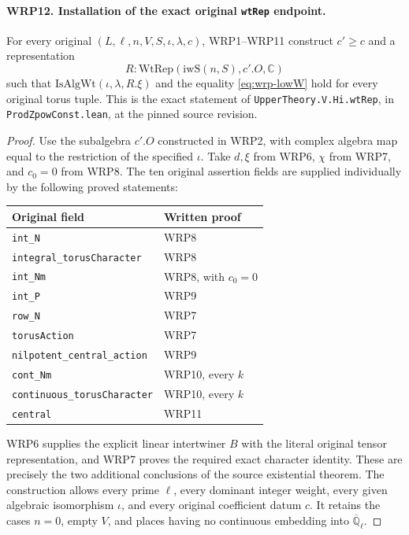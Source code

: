 \paragraph{WRP12. Installation of the exact original \texttt{wtRep} endpoint.}
\label{claim:WRP12}
For every original $(L,\ell,n,V,S,\iota,\lambda,c)$,
WRP1--WRP11 construct $c'\geq c$ and a representation
\[
                  R:\mathrm{WtRep}(\mathrm{iwS}(n,S),c'.O,\mathbb C)
\]
such that $\mathrm{IsAlgWt}(\iota,\lambda,R.\xi)$ and
the equality \eqref{eq:wrp-lowW} hold for every original
torus tuple.  This is the exact statement of
\texttt{UpperTheory.V.Hi.wtRep}, in
\texttt{ProdZpowConst.lean}, at the pinned source revision.
\begin{proof}
Use the subalgebra $c'.O$ constructed in WRP2, with
complex algebra map equal to the restriction of the
specified $\iota$.  Take $d,\xi$ from WRP6,
$\chi$ from WRP7, and $c_0=0$ from WRP8.  The ten
original assertion fields are supplied individually
by the following proved statements:
\begin{center}
\begin{tabular}{ll}
Original field & Written proof \\
\hline
\texttt{int\_N} & WRP8 \\
\texttt{integral\_torusCharacter} & WRP8 \\
\texttt{int\_Nm} & WRP8, with $c_0=0$ \\
\texttt{int\_P} & WRP9 \\
\texttt{row\_N} & WRP7 \\
\texttt{torusAction} & WRP7 \\
\texttt{nilpotent\_central\_action} & WRP9 \\
\texttt{cont\_Nm} & WRP10, every $k$ \\
\texttt{continuous\_torusCharacter} & WRP10, every $k$ \\
\texttt{central} & WRP11
\end{tabular}
\end{center}
WRP6 supplies the explicit linear intertwiner $B$ with
the literal original tensor representation, and WRP7
proves the required exact character identity.  These
are precisely the two additional conclusions of
the source existential theorem.  The construction
allows every prime $\ell$, every dominant integer
weight, every given algebraic isomorphism $\iota$,
and every original coefficient datum $c$.  It retains
the cases $n=0$, empty $V$, and places having no
continuous embedding into $\overline{\mathbb Q}_\ell$.
\end{proof}

